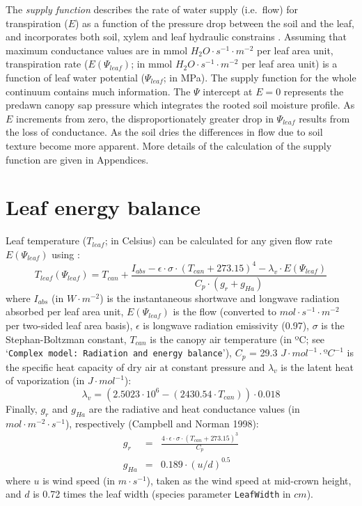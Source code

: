 \documentclass[]{book}
\begin{document}
The \emph{supply function} describes the rate of water supply (i.e.~flow) for transpiration (\(E\)) as a function of the pressure drop between the soil and the leaf, and incorporates both soil, xylem and leaf hydraulic constrains \citep{Sperry1998, Sperry2015, Sperry2016a}. Assuming that maximum conductance values are in mmol \(H_2O \cdot s^{-1} \cdot m^{-2}\) per leaf area unit, transpiration rate (\(E(\Psi_{leaf})\); in mmol \(H_2O \cdot s^{-1} \cdot m^{-2}\) per leaf area unit) is a function of leaf water potential (\(\Psi_{leaf}\); in MPa). The supply function for the whole continuum contains much information. The \(\Psi\) intercept at \(E=0\) represents the predawn canopy sap pressure which integrates the rooted soil moisture profile. As \(E\) increments from zero, the disproportionately greater drop in \(\Psi_{leaf}\) results from the loss of conductance. As the soil dries the differences in flow due to soil texture become more apparent. More details of the calculation of the supply function are given in Appendices.

\hypertarget{leaf-energy-balance}{%
\section{Leaf energy balance}\label{leaf-energy-balance}}

Leaf temperature (\(T_{leaf}\); in Celsius) can be calculated for any given flow rate \(E(\Psi_{leaf})\) using \citep{Campbell1998}:
\begin{equation}
T_{leaf}(\Psi_{leaf}) = T_{can}+\frac{I_{abs}-\epsilon\cdot\sigma\cdot(T_{can}+273.15)^4-\lambda_v\cdot E(\Psi_{leaf})}{C_p\cdot(g_r+g_{Ha})}
\end{equation}
where \(I_{abs}\) (in \(W \cdot m^{-2}\)) is the instantaneous shortwave and longwave radiation absorbed per leaf area unit, \(E(\Psi_{leaf})\) is the flow (converted to \(mol \cdot s^{-1} \cdot m^{-2}\) per two-sided leaf area basis), \(\epsilon\) is longwave radiation emissivity (0.97), \(\sigma\) is the Stephan-Boltzman constant, \(T_{can}\) is the canopy air temperature (in ºC; see `\texttt{Complex model: Radiation and energy balance}'), \(C_p\) = 29.3 \(J \cdot mol^{-1}\cdot ºC^{-1}\) is the specific heat capacity of dry air at constant pressure and \(\lambda_v\) is the latent heat of vaporization (in \(J \cdot mol^{-1}\)):
\begin{equation}
\lambda_v = (2.5023\cdot 10^6-(2430.54\cdot T_{can}))\cdot 0.018
\end{equation}
Finally, \(g_r\) and \(g_{Ha}\) are the radiative and heat conductance values (in \(mol·m^{-2}·s^{-1}\)), respectively (Campbell and Norman 1998):
\begin{eqnarray}
g_r &=& \frac{4\cdot \epsilon \cdot \sigma \cdot (T_{can}+273.15)^3}{C_p} \\
g_{Ha} &=& 0.189 \cdot (u/d)^{0.5}
\end{eqnarray}
where \(u\) is wind speed (in \(m·s^{-1}\)), taken as the wind speed at mid-crown height, and \(d\) is 0.72 times the leaf width (species parameter \texttt{LeafWidth} in \(cm\)).
\end{document}
